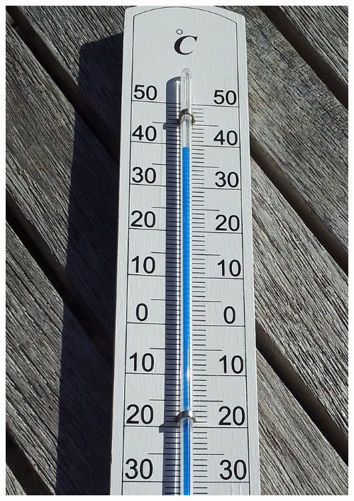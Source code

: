 \documentclass[12pt, block=fill]{beamer}
\begin{document}
\begin{frame}
\begin{columns}
\begin{column}{0.45\textwidth}
  \end{column}
\begin{column}{0.53\textwidth}
\vspace{.5cm}
\includegraphics[width = \textwidth]{figures/thermometer}
  \end{column}
  \end{columns}

\end{frame}
\end{document}

